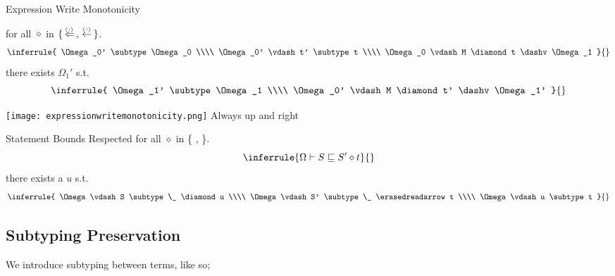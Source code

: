 \documentclass[12pt,twoside]{report}
\begin{document}
\begin{Property}{Expression Write Monotonicity}{} %
  \begin{minipage}{0.6\textwidth}
    \centering
    for all $\diamond$ in $\{  \,\stackrel{_(._)}{\Leftarrow}\,, \,\stackrel{_(._)}{\leftarrow}\,  \}$.
    \[\inferrule{
      \Omega_0' \subtype \Omega_0 \\\\
      \Omega_0' \vdash t' \subtype t \\\\
      \Omega_0 \vdash M \diamond t \dashv \Omega_1
    }{}\]
    there exists $\Omega_1'$ s.t.
    \[\inferrule{
      \Omega_1' \subtype \Omega_1 \\\\
      \Omega_0' \vdash M \diamond t' \dashv \Omega_1' 
    }{}\]
  \end{minipage}
  \begin{minipage}{0.3\textwidth}
    \centering
    \texttt{[image: expressionwritemonotonicity.png]}
    Always up and right
  \end{minipage}
  \label{property:expressionwritemonotonicity}
\end{Property}

\begin{Property}{Statement Bounds Respected}{} %
    \centering
    for all $\diamond$ in \{ \readarrowabs, \movearrowabs \}.
    \[\inferrule{
      \Omega \vdash S \subtype S' \diamond t
    }{}\]
    there exists a $u$ s.t.
    \[\inferrule{
      \Omega \vdash S \subtype \_ \diamond u \\\\
      \Omega \vdash S' \subtype \_ \erasedreadarrow t \\\\
      \Omega \vdash u \subtype t
    }{}\]
\end{Property}
\label{theorem:statementbounds}

\subsection{Subtyping Preservation}
We introduce subtyping between terms, like so;
\end{document}
